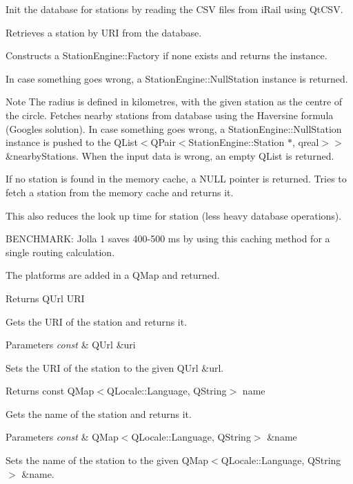 Init the database for stations by reading the C\+SV files from i\+Rail using Qt\+C\+SV.

Retrieves a station by U\+RI from the database.

Constructs a Station\+Engine\+::\+Factory if none exists and returns the instance.

In case something goes wrong, a Station\+Engine\+::\+Null\+Station instance is returned.

\begin{DoxyNote}{Note}
The radius is defined in kilometres, with the given station as the centre of the circle. Fetches nearby stations from database using the Haversine formula (Google\textquotesingle{}s solution). In case something goes wrong, a Station\+Engine\+::\+Null\+Station instance is pushed to the Q\+List$<$Q\+Pair$<$\+Station\+Engine\+::\+Station $\ast$, qreal$>$$>$ \&nearby\+Stations. When the input data is wrong, an empty Q\+List is returned.

If no station is found in the memory cache, a N\+U\+LL pointer is returned. Tries to fetch a station from the memory cache and returns it.
\end{DoxyNote}
This also reduces the look up time for station (less heavy database operations).

B\+E\+N\+C\+H\+M\+A\+RK\+: Jolla 1 saves 400-\/500 ms by using this caching method for a single routing calculation.

The platforms are added in a Q\+Map and returned.

\begin{DoxyReturn}{Returns}
Q\+Url U\+RI
\end{DoxyReturn}
Gets the U\+RI of the station and returns it.


\begin{DoxyParams}{Parameters}
{\em const} & Q\+Url \&uri\\
\hline
\end{DoxyParams}
Sets the U\+RI of the station to the given Q\+Url \&url.

\begin{DoxyReturn}{Returns}
const Q\+Map$<$\+Q\+Locale\+::\+Language, Q\+String$>$ name
\end{DoxyReturn}
Gets the name of the station and returns it.


\begin{DoxyParams}{Parameters}
{\em const} & Q\+Map$<$\+Q\+Locale\+::\+Language, Q\+String$>$ \&name\\
\hline
\end{DoxyParams}
Sets the name of the station to the given Q\+Map$<$\+Q\+Locale\+::\+Language, Q\+String$>$ \&name.

